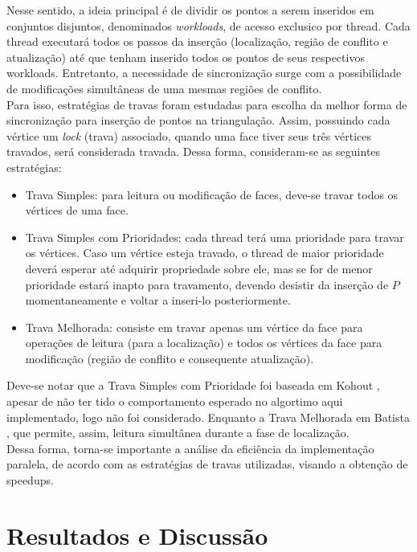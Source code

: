 \documentclass[a4paper, 12pt]{article}
\begin{document}
Nesse sentido, a ideia principal é de dividir os pontos a serem inseridos em conjuntos disjuntos, denominados \textit{workloads}, 
de acesso exclusico por thread. Cada thread executará todos os passos da inserção (localização, região de conflito e atualização) até
que tenham inserido todos os pontos de seus respectivos workloads. Entretanto, a necessidade de sincronização surge com a possibilidade
de modificações simultâneas de uma mesmas regiões de conflito. \\

Para isso, estratégias de travas foram estudadas para escolha da melhor forma de sincronização para inserção de pontos na triangulação. 
Assim, possuindo cada vértice um \textit{lock} (trava) associado, quando uma face tiver seus três vértices travados, será considerada 
travada. Dessa forma, consideram-se as seguintes estratégias: \\

\begin{itemize}
	\item Trava Simples: para leitura ou modificação de faces, deve-se travar todos os vértices de uma face.
	\item Trava Simples com Prioridades: cada thread terá uma prioridade para travar os vértices. Caso um vértice esteja travado, 
		o thread de maior prioridade deverá esperar até adquirir propriedade sobre ele, mas se for de menor prioridade estará
		inapto para travamento, devendo desistir da inserção de $P$ momentaneamente e voltar a inseri-lo posteriormente.
	\item Trava Melhorada: consiste em travar apenas um vértice da face para operações de leitura (para a localização) e 
		todos os vértices da face para modificação (região de conflito e consequente atualização).
\end{itemize}

Deve-se notar que a Trava Simples com Prioridade foi baseada em Kohout \cite{kohout}, apesar de não ter tido o comportamento esperado 
no algortimo aqui implementado, logo não foi considerado. Enquanto a Trava Melhorada em Batista \cite{batista}, que permite, assim, leitura simultânea
durante a fase de localização. \\

Dessa forma, torna-se importante a análise da eficiência da implementação paralela, de acordo com as estratégias de travas utilizadas,
visando a obtenção de speedups.

\section*{Resultados e Discussão}
\end{document}
